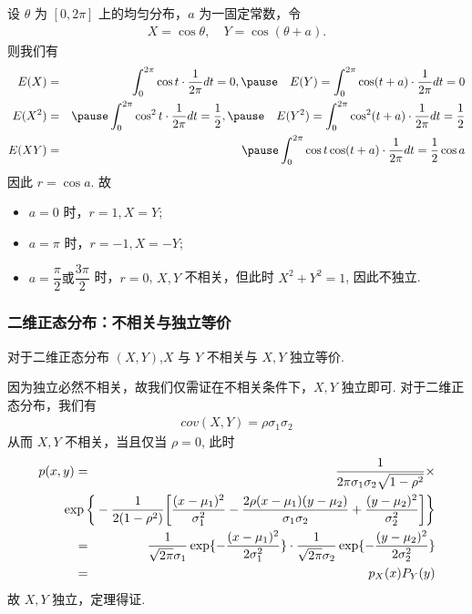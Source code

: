 \documentclass[Prob-All.tex]{subfiles}
\begin{document}
\begin{frame}
	\vspace{0.3cm}
	\begin{exam}
		设 $\theta$ 为 $[0,2\pi]$ 上的均匀分布，$a$ 为一固定常数，令
		\begin{eqnarray*}
			X=\cos \theta, \quad Y=\cos (\theta+a).
		\end{eqnarray*}
		则我们有 \pause
		\begin{eqnarray*}
			E(X)&=&\int_0^{2\pi}\cos t \cdot \dfrac{1}{2\pi}dt=0,\pause \quad  E(Y)=\int_0^{2\pi}\cos (t+a) \cdot \dfrac{1}{2\pi}dt=0\\
			E(X^2)&=&\pause \int_0^{2\pi}\cos^2 t \cdot \dfrac{1}{2\pi}dt=\dfrac{1}{2},\pause \quad E(Y^2)=\int_0^{2\pi}\cos^2 (t+a) \cdot \dfrac{1}{2\pi}dt=\dfrac{1}{2}\\
			E(XY)&=&\pause \int_0^{2\pi}\cos t \cos(t+a) \cdot \dfrac{1}{2\pi}dt=\dfrac{1}{2}\cos a
		\end{eqnarray*}
		\pause 因此 $r=\cos a$. 故
		\begin{itemize}[<+-|alert@+>]
			\item $a=0$ 时，$r=1, X=Y$;
			\item $a=\pi$ 时，$r=-1, X=-Y$;
			\item $a=\dfrac{\pi}{2}\mbox{或}\dfrac{3\pi}{2}$ 时，$r=0$, $X,Y$ 不相关，但此时 $X^2+Y^2=1$, 因此不独立.
		\end{itemize}

	\end{exam}
\end{frame}

\begin{frame}
	\frametitle{二维正态分布：不相关与独立等价}
	\begin{thm}
		对于二维正态分布 $(X,Y)$,$X$ 与 $Y$ 不相关与 $X,Y$ 独立等价.
	\end{thm}

	\pause \zheng 因为独立必然不相关，故我们仅需证在不相关条件下，$X,Y$ 独立即可. \pause 对于二维正态分布，我们有
	\begin{eqnarray*}
		cov(X,Y)=\rho\sigma_1\sigma_2
	\end{eqnarray*}
	\pause 从而 $X,Y$ 不相关，当且仅当 $\rho=0$, 此时
	\begin{eqnarray*}
		p(x,y)&=&\dfrac{1}{2\pi \sigma_1\sigma_2\sqrt{1-\rho^2}}\times\\
		&&\hspace{-1cm}\exp\bigg\{-\dfrac{1}{2(1-\rho^2)}\bigg[\dfrac{(x-\mu_1)^2}{\sigma_1^2}-\dfrac{2\rho(x-\mu_1)(y-\mu_2)}{\sigma_1\sigma_2}+\dfrac{(y-\mu_2)^2}{\sigma_2^2}\bigg]\bigg\}\\
		&=&\dfrac{1}{\sqrt{2\pi}\sigma_1}\exp\{-\dfrac{(x-\mu_1)^2}{2\sigma_1^2}\}\cdot \dfrac{1}{\sqrt{2\pi}\sigma_2}\exp\{-\dfrac{(y-\mu_2)^2}{2\sigma_2^2}\}\\
		&=&p_X(x)P_Y(y)
	\end{eqnarray*}
	故 $X,Y$ 独立，定理得证.


\end{frame}
\end{document}
